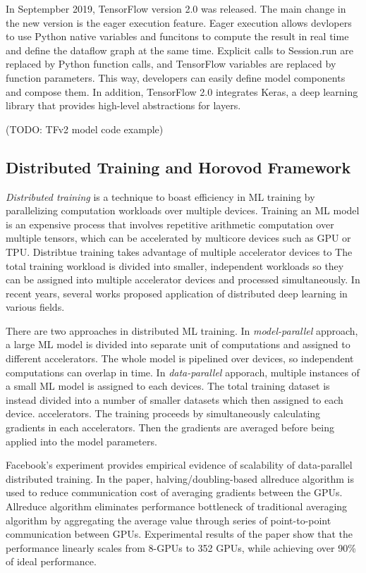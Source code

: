 In Septempber 2019, TensorFlow version 2.0 was released\cite{tf2announce}.
The main change in the new version is the eager execution feature.
Eager execution allows devlopers to use Python native variables
and funcitons to compute the result in real time and define the
dataflow graph at the same time.
Explicit calls to Session.run are replaced by Python function calls,
and TensorFlow variables are replaced by function parameters.
This way, developers can easily define model components and compose them. 
In addition, TensorFlow 2.0 integrates Keras\cite{keras},
a deep learning library that provides high-level abstractions for layers.

(TODO: TFv2 model code example)

\subsection{Distributed Training and Horovod Framework}

\textit{Distributed training} is a technique to boast efficiency in ML training
by parallelizing computation workloads over multiple devices.
Training an ML model is an expensive process that involves repetitive
arithmetic computation over multiple tensors,
which can be accelerated by multicore devices such as GPU or TPU. 
Distribtue training takes advantage of multiple accelerator devices to
The total training workload is divided into smaller, independent workloads
so they can be assigned into multiple accelerator devices and
processed simultaneously. 
In recent years, several works proposed application of distributed
deep learning in various fields.

There are two approaches in distributed ML training.
In \textit{model-parallel} approach, a large ML model is divided into 
separate unit of computations and assigned to different accelerators. 
The whole model is pipelined over devices, so independent computations
can overlap in time.
In \textit{data-parallel} apporach, multiple instances of a small ML model
is assigned to each devices. The total training dataset is instead
divided into a number of smaller datasets which then assigned to each device.
accelerators. The training proceeds by simultaneously calculating gradients
in each accelerators. Then the gradients are averaged before being 
applied into the model parameters.

Facebook's experiment \cite{facebook2018} provides empirical evidence of
scalability of data-parallel distributed training. In the paper, 
halving/doubling-based allreduce algorithm is used to reduce communication cost 
of averaging gradients between the GPUs. 
Allreduce algorithm eliminates performance bottleneck of traditional
averaging algorithm by aggregating the average value through series of
point-to-point communication between GPUs. 
Experimental results of the paper show that the performance linearly
scales from 8-GPUs to 352 GPUs, while achieving over 90\% of ideal performance.

